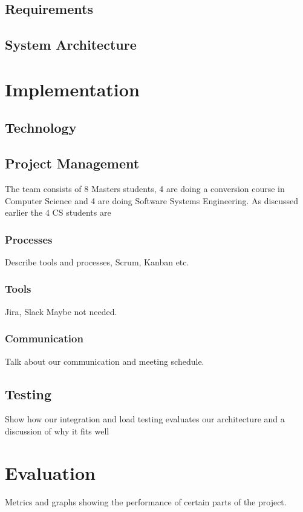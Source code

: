 \documentclass[prodmode,acmtecs]{acmsmall} %
\begin{document}
\subsection{Requirements}

\subsection{System Architecture}

\section{Implementation}


\subsection{Technology}

\subsection{Project Management}
The team consists of 8 Masters students, 4 are doing a conversion course in Computer Science and 4 are doing Software Systems Engineering. As discussed earlier the 4 CS students are 
\subsubsection{Processes}
Describe tools and processes, Scrum, Kanban etc.


\subsubsection{Tools}
Jira, Slack Maybe not needed.

\subsubsection{Communication}
Talk about our communication and meeting schedule.


\subsection{Testing}
Show how our integration and load testing evaluates our architecture and a discussion of why it fits well

\section{Evaluation}
Metrics and graphs showing the performance of certain parts of the project.
\end{document}
